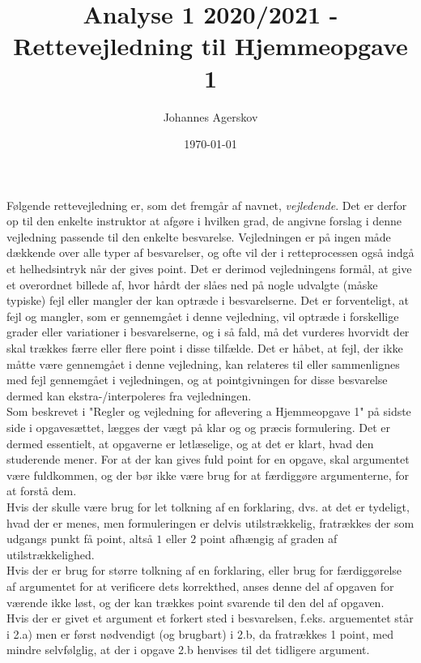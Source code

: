 \documentclass{article}
\title{Analyse 1 2020/2021 - Rettevejledning til Hjemmeopgave 1}
\author{Johannes Agerskov}
\date{\today}
\begin{document}
	
	\maketitle
Følgende rettevejledning er, som det fremgår af navnet, \emph{vejledende}. Det er derfor op til den enkelte instruktor at afgøre i hvilken grad, de angivne forslag i denne vejledning passende til den enkelte besvarelse. Vejledningen er på ingen måde dækkende over alle typer af besvarelser, og ofte vil der i retteprocessen også indgå et helhedsintryk når der gives point. Det er derimod vejledningens formål, at give et overordnet billede af, hvor hårdt der slåes ned på nogle udvalgte (måske typiske) fejl eller mangler der kan optræde i besvarelserne. Det er forventeligt, at fejl og mangler, som er gennemgået i denne vejledning, vil optræde i forskellige grader eller variationer i besvarelserne, og i så fald, må det vurderes hvorvidt der skal trækkes færre eller flere point i disse tilfælde. Det er håbet, at fejl, der ikke måtte være gennemgået i denne vejledning, kan relateres til eller sammenlignes med fejl gennemgået i vejledningen, og at pointgivningen for disse besvarelse dermed kan ekstra-/interpoleres fra vejledningen.
\vspace*{0.5cm}\\
Som beskrevet i "Regler og vejledning for aflevering a Hjemmeopgave 1" på sidste side i opgavesættet, lægges der vægt på klar og og præcis formulering. Det er dermed essentielt, at opgaverne er letlæselige, og at det er klart, hvad den studerende mener. For at der kan gives fuld point for en opgave, skal argumentet være fuldkommen, og der bør ikke være brug for at færdiggøre argumenterne, for at forstå dem.
\vspace*{0.2cm}
\\
Hvis der skulle være brug for let tolkning af en forklaring, dvs. at det er tydeligt, hvad der er menes, men formuleringen er delvis utilstrækkelig, fratrækkes der som udgangs punkt få point, altså $ 1 $ eller $ 2 $ point afhængig af graden af utilstrækkelighed.
\vspace*{0.2cm}\\
Hvis der er brug for større tolkning af en forklaring, eller brug for færdiggørelse af argumentet for at verificere dets korrekthed, anses denne del af opgaven for værende ikke løst, og der kan trækkes point svarende til den del af opgaven.
\vspace*{0.2cm}\\
Hvis der er givet et argument et forkert sted i besvarelsen, f.eks. arguementet står i 2.a) men er først nødvendigt (og brugbart) i 2.b, da fratrækkes 1 point, med mindre selvfølglig, at der i opgave 2.b henvises til det tidligere argument.
\end{document}

